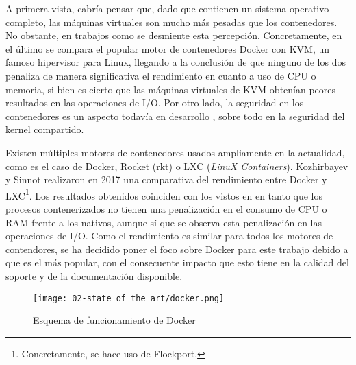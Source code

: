 A primera vista, cabría pensar que, dado que contienen un sistema operativo
completo, las máquinas virtuales son mucho más pesadas que los contenedores. No
obstante, en trabajos como \cite{manco_my_2017} \cite{felter_updated_2015} se
desmiente esta percepción. Concretamente, en el último se compara el popular
motor de contenedores Docker con KVM, un famoso hipervisor para Linux, llegando
a la conclusión de que ninguno de los dos penaliza de manera significativa el
rendimiento en cuanto a uso de CPU o memoria, si bien es cierto que las máquinas
virtuales de KVM obtenían peores resultados en las operaciones de I/O. Por otro
lado, la seguridad en los contenedores es un aspecto todavía en desarrollo
\cite{randal_ideal_2020}, sobre todo en la seguridad del kernel compartido.

Existen múltiples motores de contenedores usados ampliamente en la actualidad,
como es el caso de Docker, Rocket (rkt) o LXC (\textit{LinuX Containers}).
Kozhirbayev y Sinnot \cite{kozhirbayev_performance_2017} realizaron en 2017 una
comparativa del rendimiento entre Docker y LXC\footnote{Concretamente, se hace
  uso de Flockport.}. Los resultados obtenidos coinciden con los vistos en
\cite{felter_updated_2015} en tanto que los procesos contenerizados no tienen
una penalización en el consumo de CPU o RAM frente a los nativos, aunque sí que
se observa esta penalización en las operaciones de I/O. Como el rendimiento es
similar para todos los motores de contendores, se ha decidido poner el foco
sobre Docker para este trabajo debido a que es el más popular, con el
consecuente impacto que esto tiene en la calidad del soporte y de la
documentación disponible.

\begin{figure}
  \centering
  \texttt{[image: 02-state\_of\_the\_art/docker.png]}
  \caption{Esquema de funcionamiento de Docker}
  \label{fig:02-docker}
\end{figure}

